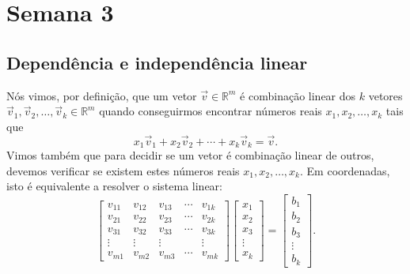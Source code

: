 


\providecommand{\dir}{..}


%

\chapter{Semana 3}

\section{Dependência e independência linear}

Nós vimos, por definição, que um vetor $\vec{v} \in \mathbb{R}^m$ é combinação linear dos $k$ vetores $\vec{v}_1, \vec{v}_2, \dots, \vec{v}_k  \in \mathbb{R}^m$ quando conseguirmos encontrar números reais $x_1, x_2, \dots, x_k$ tais que
\begin{equation}
x_1 \vec{v}_1 + x_2 \vec{v}_2 + \cdots + x_k \vec{v}_k = \vec{v}.
\end{equation} Vimos também que para decidir se um vetor é combinação linear de outros, devemos verificar se existem estes números reais $x_1, x_2, \dots, x_k$. Em coordenadas, isto é equivalente a resolver o sistema linear:
\begin{equation}
\left[
  \begin{array}{ccccc}
   v_{11} & v_{12} & v_{13} & \cdots & v_{1k}  \\
   v_{21} & v_{22} & v_{23} & \cdots & v_{2k}  \\
   v_{31} & v_{32} & v_{33} & \cdots & v_{3k}  \\
   \vdots & \vdots & \vdots &        & \vdots  \\
   v_{m1} & v_{m2} & v_{m3} & \cdots & v_{mk}  
  \end{array}
\right] \left[
  \begin{array}{c}
    x_{1} \\
    x_{2} \\
    x_{3} \\
    \vdots \\
    x_{k} 
  \end{array}
\right] =
\left[
  \begin{array}{c}
    b_{1} \\
    b_{2} \\
    b_{3} \\
    \vdots \\
    b_{k} 
  \end{array}
\right].
\end{equation}


